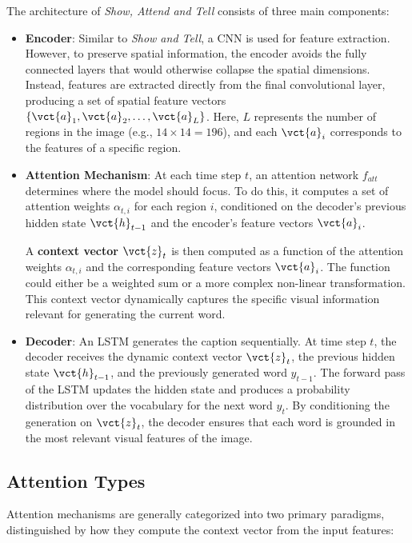 The architecture of \textit{Show, Attend and Tell} consists of three main components:
\begin{itemize}
    \item \textbf{Encoder}: Similar to \textit{Show and Tell}, a CNN is used for feature extraction.
    However, to preserve spatial information, the encoder avoids the fully connected layers that would otherwise collapse the spatial dimensions.
    Instead, features are extracted directly from the final convolutional layer, producing a set of spatial feature vectors $\{\vct{a}_1, \vct{a}_2, \dots, \vct{a}_L\}$.
    Here, $L$ represents the number of regions in the image (e.g., $14 \times 14 = 196$), and each $\vct{a}_i$ corresponds to the features of a specific region.

    \item \textbf{Attention Mechanism}: At each time step $t$, an attention network $f_{att}$ determines where the model should focus.
    To do this, it computes a set of attention weights $\alpha_{t,i}$ for each region $i$, conditioned on the decoder's previous hidden state $\vct{h}_{t-1}$ and the encoder's feature vectors $\vct{a}_i$.

    A \textbf{context vector} $\vct{z}_t$ is then computed as a function of the attention weights $\alpha_{t,i}$ and the corresponding feature vectors $\vct{a}_i$.
    The function could either be a weighted sum or a more complex non-linear transformation.
    This context vector dynamically captures the specific visual information relevant for generating the current word.

    \item \textbf{Decoder}: An LSTM generates the caption sequentially.
    At time step $t$, the decoder receives the dynamic context vector $\vct{z}_t$, the previous hidden state $\vct{h}_{t-1}$, and the previously generated word $y_{t-1}$.
    The forward pass of the LSTM updates the hidden state and produces a probability distribution over the vocabulary for the next word $y_t$.
    By conditioning the generation on $\vct{z}_t$, the decoder ensures that each word is grounded in the most relevant visual features of the image.
\end{itemize}


\subsection{Attention Types}

Attention mechanisms are generally categorized into two primary paradigms, distinguished by how they compute the context vector from the input features:

